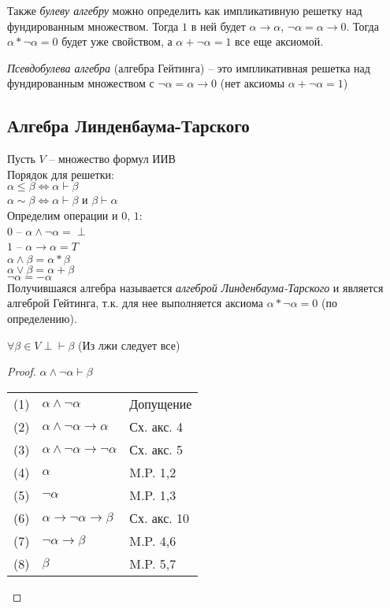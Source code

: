 Также \emph{булеву алгебру} можно определить как импликативную решетку над фундированным множеством. Тогда $1$ в ней будет $\alpha \rightarrow \alpha$, $\neg \alpha = \alpha \rightarrow 0$. Тогда $\alpha * \neg \alpha = 0$ будет уже свойством, а $\alpha + \neg \alpha = 1$ все еще аксиомой.

\emph{Псевдобулева алгебра} (алгебра Гейтинга) -- это импликативная решетка над фундированным множеством с $\neg \alpha = \alpha \rightarrow 0$ (нет аксиомы $\alpha + \neg \alpha = 1$)
\subsection{Алгебра Линденбаума-Тарского}
\label{sec-5-5}
Пусть $V$ -- множество формул ИИВ\\
Порядок для решетки:\\
$\alpha \leq \beta \Leftrightarrow  \alpha \vdash \beta$\\
$\alpha \sim \beta \Leftrightarrow \alpha \vdash \beta$ и $\beta \vdash \alpha$\\
Определим операции и $0$, $1$:\\
$0$ -- $\alpha \land \neg \alpha = \perp$\\
$1$ -- $\alpha \rightarrow \alpha = T$\\
$\alpha \land \beta = \alpha * \beta$\\
$\alpha \vee \beta = \alpha + \beta$\\
$\neg \alpha = -\alpha$\\
Получившаяся алгебра называется \emph{алгеброй Линденбаума-Тарского} и является алгеброй Гейтинга, т.к. для нее выполняется аксиома $\alpha * \neg \alpha = 0$ (по определению).
\begin{lemma}
$\forall \beta \in V \perp \vdash \beta$ (Из лжи следует все)
\end{lemma}
\begin{proof}
$\alpha \land \neg \alpha \vdash \beta$\\
\begin{tabular}{lll}
(1) &$\alpha \land \neg \alpha$& Допущение\\
(2) &$\alpha \land \neg \alpha \rightarrow \alpha$& Сх. акс. 4\\
(3) &$\alpha \land \neg \alpha \rightarrow \neg \alpha$& Сх. акс. 5\\
(4) &$\alpha$& M.P. 1,2\\
(5) &$\neg \alpha$& M.P. 1,3\\
(6) &$\alpha \rightarrow \neg \alpha \rightarrow \beta$& Сх. акс. 10\\
(7) & $\neg \alpha \rightarrow \beta$& M.P. 4,6\\
(8) & $\beta$& M.P. 5,7\\
\end{tabular}
\end{proof}
